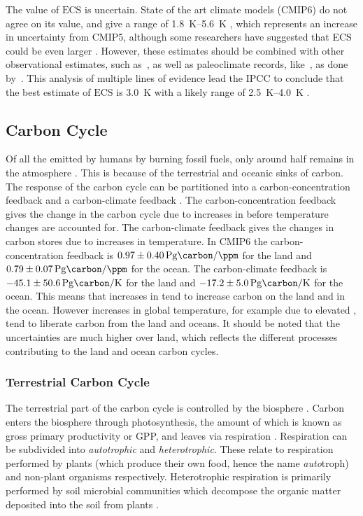 The value of $\mathrm{ECS}$ is uncertain. State of the art climate models (CMIP6) do not agree on its value, and give a range of
\SIrange{1.8}{5.6}{\kelvin} \parencite{Zelinka2020}, which represents an increase in uncertainty from CMIP5, although some researchers have suggested that ECS could be even
larger \parencite{Stainforth2005}.
However, these estimates should be combined with other observational estimates, such as~\cite{Cox2018}, as well as paleoclimate records, like~\cite{Hargreaves2012}, as done by~\cite{Sherwood2020}.
This analysis of multiple lines of evidence lead the IPCC to conclude that the best estimate of $\mathrm{ECS}$ is \SI{3.0}{\kelvin} with a likely range of \SIrange{2.5}{4.0}{\kelvin} \parencite{AR6}.

\subsection{Carbon Cycle}
Of all the  emitted by humans by burning fossil fuels, only around half remains in the atmosphere \parencite{Friedlingstein2022}. This is because of the terrestrial and oceanic sinks of carbon.
The response of the carbon cycle can be partitioned into a carbon-concentration feedback and a carbon-climate feedback \parencite{Friedlingstein2006}. The carbon-concentration feedback
gives the change in the carbon cycle due to increases in  before temperature changes are accounted for. The carbon-climate feedback gives the changes in carbon stores due to increases
in temperature. In CMIP6 \parencite{Arora2020} the carbon-concentration feedback is $\SI{0.97\pm0.40}{\peta\gram\carbon\per\ppm}$ for the land and $\SI{0.79\pm 0.07}{\peta\gram\carbon\per\ppm}$
for the ocean.
The carbon-climate feedback is $\SI{-45.1\pm50.6}{\peta\gram\carbon\per\kelvin}$ for the land and $\SI{-17.2\pm5.0}{\peta\gram\carbon\per\kelvin}$ for the ocean.
This means that increases in  tend to
increase carbon on the land and in the ocean. However increases in global temperature, for example due to elevated , tend to liberate carbon from the land and oceans. It should be noted
that the uncertainties are much higher over land, which reflects the different processes contributing to the land and ocean carbon cycles.

\subsubsection{Terrestrial Carbon Cycle}
The terrestrial part of the carbon cycle is controlled by the biosphere \parencite{AR6}. Carbon enters the biosphere through photosynthesis, the amount of which is known as gross
primary productivity or GPP, and leaves via respiration \parencite{Jenkinson1991}. Respiration can be subdivided into \emph{autotrophic} and \emph{heterotrophic}.
These relate to respiration performed by plants (which produce their own food, hence the name \emph{auto}troph) and non-plant organisms respectively. Heterotrophic respiration
is primarily performed by soil microbial communities which decompose the organic matter deposited into the soil from plants \parencite{Singh1977}.

